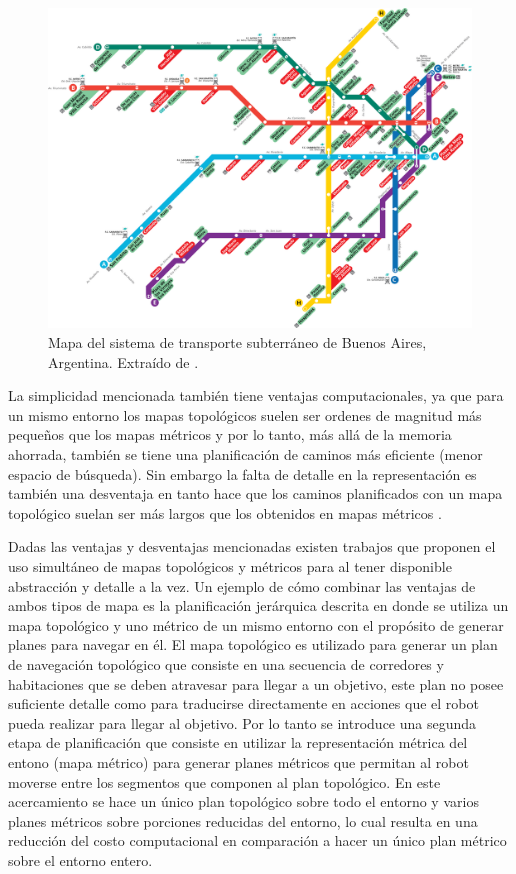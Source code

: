 \begin{figure}[H]
  \center
  \includegraphics[width=1\linewidth]{imagenes/metroBsAs.png}
  \caption[Mapa del sistema de transporte subterráneo de Buenos Aires, Argentina.]{Mapa del sistema de transporte subterráneo de Buenos Aires, Argentina. Extraído de \cite{metroBsAs}.}\label{fig:metroBsAs}
\end{figure} 

La simplicidad mencionada también tiene ventajas computacionales, ya que para un mismo entorno los mapas topológicos suelen ser ordenes de magnitud más pequeños que los mapas métricos y por lo tanto, más allá de la memoria ahorrada, también se tiene una planificación de caminos más eficiente (menor espacio de búsqueda). Sin embargo la falta de detalle en la representación es también una desventaja en tanto hace que los caminos planificados con un mapa topológico suelan ser más largos que los obtenidos en mapas métricos \cite{Thrun1998}.

Dadas las ventajas y desventajas mencionadas existen trabajos
\cite{Thrun1998,wurm2008coordinated,Liu2015} que proponen el uso simultáneo de
mapas topológicos y métricos para  al
tener disponible abstracción y detalle a la vez. Un ejemplo de cómo combinar
las ventajas de ambos tipos de mapa es la planificación jerárquica descrita en
\cite{Thrun1998} donde se utiliza un mapa topológico y uno métrico de un mismo
entorno con el propósito de generar planes para navegar en él. El mapa topológico es
utilizado para generar un plan de navegación topológico que consiste en una
secuencia de corredores y habitaciones que se deben atravesar para llegar a un
objetivo, este plan no posee suficiente detalle como
para traducirse directamente en acciones que el robot pueda realizar para
llegar al objetivo. Por lo tanto se introduce una segunda etapa de
planificación que consiste en utilizar la representación métrica del entono (mapa métrico)
para generar planes métricos que permitan al robot moverse entre los segmentos
que componen al plan topológico. En este acercamiento se hace un único plan
topológico sobre todo el entorno y varios planes métricos sobre porciones
reducidas del entorno, lo cual resulta en una reducción del costo computacional
en comparación a hacer un único plan métrico sobre el entorno entero.

